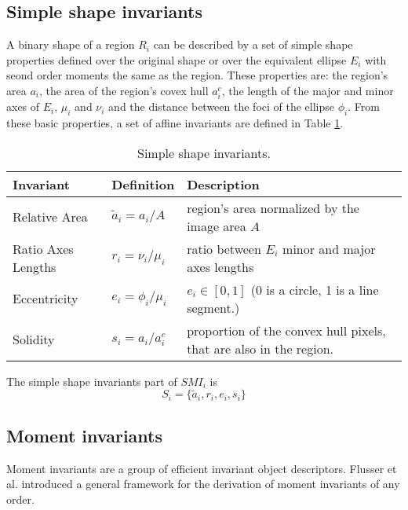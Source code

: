 \documentclass[a4paper,11pt]{article}
\begin{document}
\subsection{Simple shape invariants}
A binary shape of a region $R_i$ can be described by a set of simple shape properties defined over the original shape or over the equivalent ellipse $E_i$ with seond order moments the same as the region. These properties are: the region's area $a_i$, the area of the region's covex hull $a^c_i$, the length of the major and minor axes of $E_i$, $\mu_i$ and $\nu_i$ and the distance between the foci of the ellipse $\phi_i$.%
From these basic properties, a set of affine invariants are defined in Table \ref{tab:ssi}.   

\begin{table}[!ht]
\begin{center}
\begin{tabular}{|l||l|l|}
\hline
Invariant & Definition & Description\\
\hline
\hline
Relative Area & $\tilde{a}_i = {a_i}/{A}$ & region's area normalized by the image area $A$\\
\hline
Ratio Axes Lengths & $r_i = {\nu_i}/{\mu_i}$& ratio between $E_i$ minor and major axes lengths\\
\hline
Eccentricity &$e_i = \phi_i/\mu_i$& $e_i \in [0,1]$ (0 is a circle, 1 is a line segment.)\\
\hline
Solidity & $s_i = {a_i}/{a_i^c} $ & proportion of the convex hull pixels, that are also in the region. \\
\hline
\end{tabular}
\end{center}
\vspace{-20pt}
\caption{Simple shape invariants.} \label{tab:ssi}
  \vspace{-10pt}
\end{table}
The simple shape invariants part of $SMI_i$ is 
\begin{equation}
S_i = \{\tilde{a}_i, r_i, e_i, s_i\}
\end{equation} \label{eq:ssi}

\subsection{Moment invariants}
Moment invariants are a group of efficient invariant object descriptors. Flusser et al. introduced a general framework for the derivation of moment invariants of any order. \cite{Flusser06momentinvariants}
\end{document}
